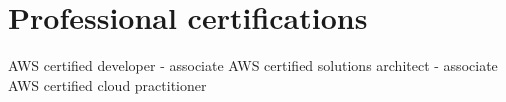 \section{Professional certifications}
{%
}
{%
	AWS certified developer - associate}
{}
{%
}
{%
	AWS certified solutions architect - associate}
{}
{%
}
{%
	AWS certified cloud practitioner}
{}

